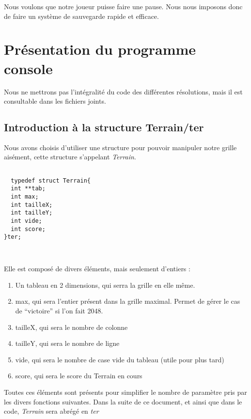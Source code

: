 \documentclass[letter]{article}
\begin{document}
Nous voulons que notre joueur puisse faire une pause. Nous nous imposons donc de faire un système de sauvegarde rapide et efficace.



\section{Présentation du programme console}
\label{sec:orgbcdb2a0}

Nous ne mettrons pas l'intégralité du code des différentes résolutions, mais il est consultable dans les fichiers joints.

\subsection{Introduction à la structure Terrain/ter}
\label{sec:org92d8115}

Nous avons choisis d'utiliser une structure pour pouvoir manipuler notre grille aisément, cette structure s'appelant \emph{Terrain}.

\begin{verbatim}

  typedef struct Terrain{
  int **tab;
  int max;
  int tailleX;
  int tailleY;
  int vide;
  int score;
}ter;



\end{verbatim}

Elle est composé de divers éléments, mais seulement d'entiers :

\begin{enumerate}
\item Un tableau en 2 dimensions, qui serra la grille en elle même.
\item max, qui sera l'entier présent dans la grille maximal. Permet de gérer le cas de “victoire” si l'on fait 2048.
\item tailleX, qui sera le nombre de colonne
\item tailleY, qui sera le nombre de ligne
\item vide, qui sera le nombre de case vide du tableau (utile pour plus tard)
\item score, qui sera le score du Terrain en cours
\end{enumerate}


Toutes ces éléments sont présents pour simplifier le nombre de paramètre pris par les divers fonctions suivantes.
Dans la suite de ce document, et ainsi que dans le code, \emph{Terrain} sera abrégé en \emph{ter}
\end{document}
